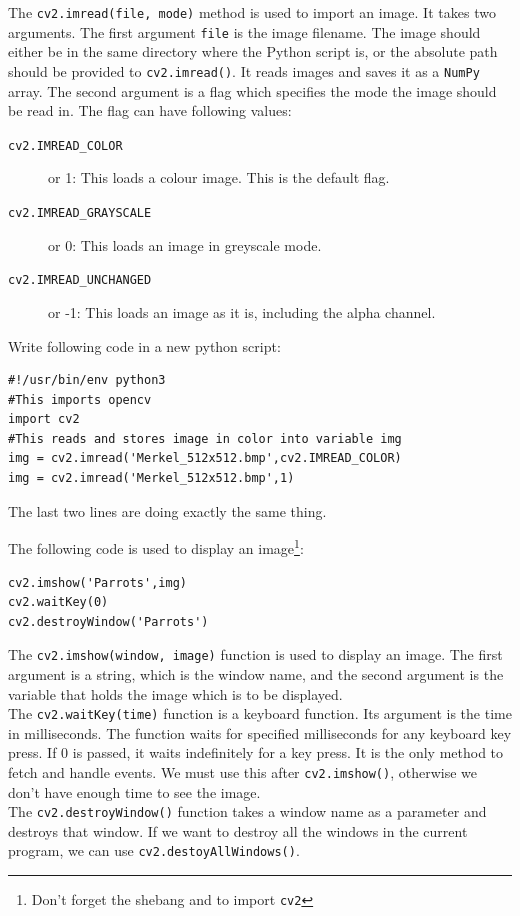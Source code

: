 \documentclass{labo}
\newcommand{\numpy}{\texttt{NumPy} }
\begin{document}
The \texttt{cv2.imread(file, mode)} method is used to import an image. It takes two arguments. The first argument \texttt{file} is the image filename. The image should either be in the same directory where the Python script is, or the absolute path should be provided to \texttt{cv2.imread()}. It reads images and saves it as a \numpy array.
The second argument is a flag which specifies the mode the image should be read in. The flag can have following values:
\begin{description}
\item[\texttt{cv2.IMREAD\_COLOR}] or 1: This loads a colour image. This is the default flag.
\item[\texttt{cv2.IMREAD\_GRAYSCALE}] or 0: This loads an image in greyscale mode.
\item[\texttt{cv2.IMREAD\_UNCHANGED}] or -1: This loads an image as it is, including the alpha channel.
\end{description}


Write following code in a new python script:
\begin{verbatim}
#!/usr/bin/env python3
#This imports opencv
import cv2
#This reads and stores image in color into variable img
img = cv2.imread('Merkel_512x512.bmp',cv2.IMREAD_COLOR)
img = cv2.imread('Merkel_512x512.bmp',1)
\end{verbatim}
The last two lines are doing exactly the same thing.

The following code is used to display an image\footnote{Don't forget the shebang and to import \texttt{cv2}}:
\begin{verbatim}
cv2.imshow('Parrots',img)
cv2.waitKey(0)
cv2.destroyWindow('Parrots')
\end{verbatim}

The \texttt{cv2.imshow(window, image)} function is used to display an image. The first argument is a string, which is the window name, and the second argument is the variable that holds the image which is to be displayed.\\

The \texttt{cv2.waitKey(time)} function is a keyboard function. Its argument is the time in milliseconds.
The function waits for specified milliseconds for any keyboard key press. If 0 is passed, it waits indefinitely for a key press. It is the only method to fetch and handle events. We must use this after \texttt{cv2.imshow()}, otherwise we don't have enough time to see the image.\\

The \texttt{cv2.destroyWindow()} function takes a window name as a parameter and destroys that window. If we want to destroy all the windows in the current program, we can use \texttt{cv2.destoyAllWindows()}.\\
\end{document}
